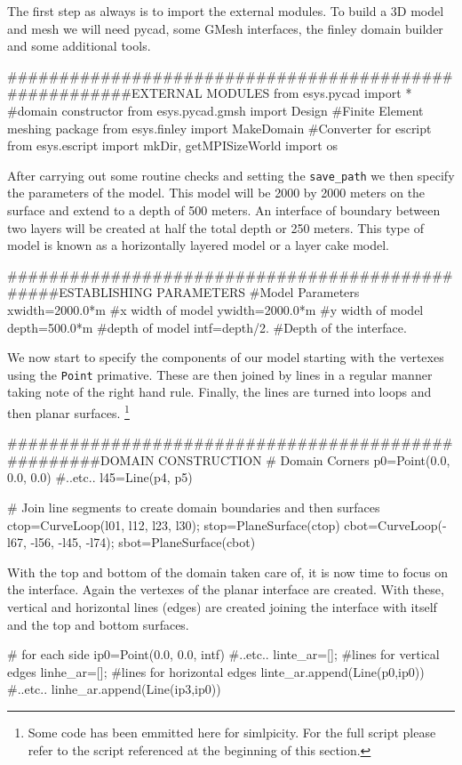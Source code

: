 The first step as always is to import the external modules. To build a 3D model
and mesh we will need pycad, some GMesh interfaces, the finley domain builder
and some additional tools.
\begin{python}
#######################################################EXTERNAL MODULES
from esys.pycad import * #domain constructor
from esys.pycad.gmsh import Design #Finite Element meshing package
from esys.finley import MakeDomain #Converter for escript
from esys.escript import mkDir, getMPISizeWorld
import os
\end{python}
After carrying out some routine checks and setting the \verb!save_path! we then
specify the parameters of the model. This model will be 2000 by 2000 meters on
the surface and extend to a depth of 500 meters. An interface of boundary
between two layers will be created at half the total depth or 250 meters. This
type of model is known as a horizontally layered model or a layer cake model. 
\begin{python}
################################################ESTABLISHING PARAMETERS
#Model Parameters
xwidth=2000.0*m   #x width of model
ywidth=2000.0*m   #y width of model
depth=500.0*m   #depth of model
intf=depth/2.   #Depth of the interface.
\end{python}
We now start to specify the components of our model starting with the vertexes
using the \verb!Point! primative. These are then joined by lines in a regular
manner taking note of the right hand rule. Finally, the lines are turned into
loops and then planar surfaces.
\footnote{Some code has been emmitted here for
simlpicity. For the full script please refer to the script referenced at the beginning of
this section.}
\begin{python}
####################################################DOMAIN CONSTRUCTION
# Domain Corners
p0=Point(0.0,    0.0,      0.0)
#..etc..
l45=Line(p4, p5)

# Join line segments to create domain boundaries and then surfaces
ctop=CurveLoop(l01, l12, l23, l30);     stop=PlaneSurface(ctop)
cbot=CurveLoop(-l67, -l56, -l45, -l74); sbot=PlaneSurface(cbot)
\end{python}
With the top and bottom of the domain taken care of, it is now time to focus on
the interface. Again the vertexes of the planar interface are created. With
these, vertical and horizontal lines (edges) are created joining the interface
with itself and the top and bottom surfaces. 
\begin{python}
# for each side
ip0=Point(0.0,    0.0,      intf)
#..etc..
linte_ar=[]; #lines for vertical edges
linhe_ar=[]; #lines for horizontal edges
linte_ar.append(Line(p0,ip0))
#..etc..
linhe_ar.append(Line(ip3,ip0))
\end{python}
